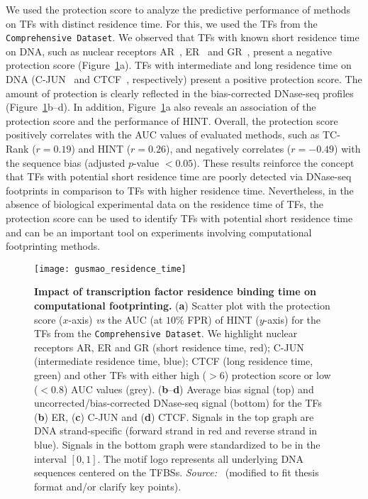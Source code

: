 We used the protection score to analyze the predictive performance of methods on TFs with distinct residence time. For this, we used the TFs from the {\tt Comprehensive Dataset}. We observed that TFs with known short residence time on DNA, such as nuclear receptors AR~\citep{tewari2012}, ER~\citep{sharp2006} and GR~\citep{mcnally2000}, present a negative protection score (Figure~\ref{fig:gusmao_residence_time}a). TFs with intermediate and long residence time on DNA (C-JUN~\citep{malnou2010} and CTCF~\citep{nakahashi2013}, respectively) present a positive protection score. The amount of protection is clearly reflected in the bias-corrected DNase-seq profiles (Figure~\ref{fig:gusmao_residence_time}b--d). In addition, Figure~\ref{fig:gusmao_residence_time}a also reveals an association of the protection score and the performance of HINT. Overall, the protection score positively correlates with the AUC values of evaluated methods, such as TC-Rank ($r = 0.19$) and HINT ($r = 0.26$), and negatively correlates ($r = -0.49$) with the sequence bias (adjusted $p$-value $< 0.05$). These results reinforce the concept that TFs with potential short residence time are poorly detected via DNase-seq footprints in comparison to TFs with higher residence time. Nevertheless, in the absence of biological experimental data on the residence time of TFs, the protection score can be used to identify TFs with potential short residence time and can be an important tool on experiments involving computational footprinting methods.

\begin{figure}[h!]
\centering
\texttt{[image: gusmao\_residence\_time]}
\caption[Impact of transcription factor residence binding time on computational footprinting]{\textbf{Impact of transcription factor residence binding time on computational footprinting.} (\textbf{a}) Scatter plot with the protection score ($x$-axis) \emph{vs} the AUC (at $10\%$ FPR) of HINT ($y$-axis) for the TFs from the {\tt Comprehensive Dataset}. We highlight nuclear receptors AR, ER and GR (short residence time, red); C-JUN (intermediate residence time, blue); CTCF (long residence time, green) and other TFs with either high ($> 6$) protection score or low ($< 0.8$) AUC values (grey). (\textbf{b}--\textbf{d}) Average bias signal (top) and uncorrected/bias-corrected DNase-seq signal (bottom) for the TFs (\textbf{b}) ER, (\textbf{c}) C-JUN and (\textbf{d}) CTCF. Signals in the top graph are DNA strand-specific (forward strand in red and reverse strand in blue). Signals in the bottom graph were standardized to be in the interval $[0,1]$. The motif logo represents all underlying DNA sequences centered on the TFBSs. \emph{Source:~\cite{gusmao2016}} (modified to fit thesis format and/or clarify key points).}
\label{fig:gusmao_residence_time}
\end{figure}

